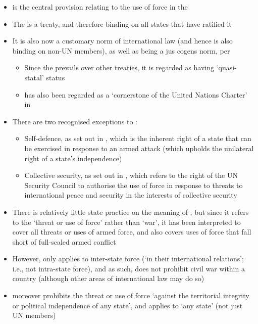 \begin{itemize}
    \item {} is the central provision relating to the use of force in the 
    \item The  is a treaty, and therefore binding on all states that have ratified it
    \item It is also now a customary norm of international law (and hence is also binding on non-UN members), as well as being a \gls{jus cogens} norm, per 
    \begin{itemize}
        \item Since the  prevails over other treaties, it is regarded as having `quasi-statal' status
        \item {} has also been regarded as a `cornerstone of the United Nations Charter' in 
    \end{itemize}
    \item There are two recognised exceptions to :
    \begin{itemize}
        \item Self-defence, as set out in , which is the inherent right of a state that can be exercised in response to an armed attack (which upholds the unilateral right of a state's independence)
        \item Collective security, as set out in , which refers to the right of the UN Security Council to authorise the use of force in response to threats to international peace and security in the interests of collective security
    \end{itemize}
    \item There is relatively little state practice on the meaning of , but since it refers to the `threat or use of force' rather than `war', it has been interpreted to cover all threats or uses of armed force, and also covers uses of force that fall short of full-scaled armed conflict
    \item However,  only applies to inter-state force (`in their international relations'; i.e., not intra-state force), and as such, does not prohibit civil war within a country (although other areas of international law may do so)
    \item {} moreover prohibits the threat or use of force `against the territorial integrity or political independence of any state', and applies to `any state' (not just UN members)

\end{itemize}
